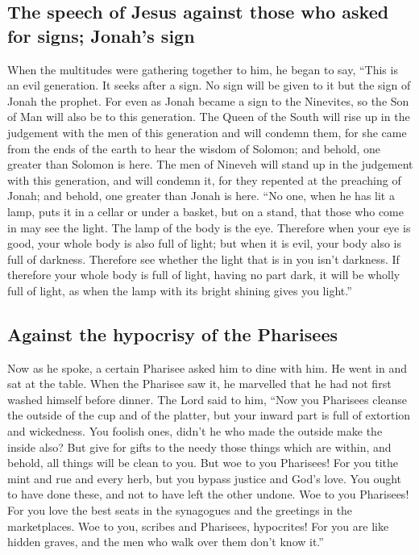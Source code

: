 \hypertarget{the-speech-of-jesus-against-those-who-asked-for-signs-jonahs-sign}{%
\subsection{The speech of Jesus against those who asked for signs;
Jonah's
sign}\label{the-speech-of-jesus-against-those-who-asked-for-signs-jonahs-sign}}

 When the multitudes were gathering together to him, he
began to say, ``This is an evil generation. It seeks after a sign. No
sign will be given to it but the sign of Jonah the prophet.
 For even as Jonah became a sign to the Ninevites, so the
Son of Man will also be to this generation.  The Queen of
the South will rise up in the judgement with the men of this generation
and will condemn them, for she came from the ends of the earth to hear
the wisdom of Solomon; and behold, one greater than Solomon is here.
 The men of Nineveh will stand up in the judgement with
this generation, and will condemn it, for they repented at the preaching
of Jonah; and behold, one greater than Jonah is here. 
``No one, when he has lit a lamp, puts it in a cellar or under a basket,
but on a stand, that those who come in may see the light.
 The lamp of the body is the eye. Therefore when your eye
is good, your whole body is also full of light; but when it is evil,
your body also is full of darkness.  Therefore see
whether the light that is in you isn't darkness.  If
therefore your whole body is full of light, having no part dark, it will
be wholly full of light, as when the lamp with its bright shining gives
you light.''

\hypertarget{against-the-hypocrisy-of-the-pharisees}{%
\subsection{Against the hypocrisy of the
Pharisees}\label{against-the-hypocrisy-of-the-pharisees}}

 Now as he spoke, a certain Pharisee asked him to dine
with him. He went in and sat at the table.  When the
Pharisee saw it, he marvelled that he had not first washed himself
before dinner.  The Lord said to him, ``Now you Pharisees
cleanse the outside of the cup and of the platter, but your inward part
is full of extortion and wickedness.  You foolish ones,
didn't he who made the outside make the inside also?  But
give for gifts to the needy those things which are within, and behold,
all things will be clean to you.  But woe to you
Pharisees! For you tithe mint and rue and every herb, but you bypass
justice and God's love. You ought to have done these, and not to have
left the other undone.  Woe to you Pharisees! For you
love the best seats in the synagogues and the greetings in the
marketplaces.  Woe to you, scribes and Pharisees,
hypocrites! For you are like hidden graves, and the men who walk over
them don't know it.''

